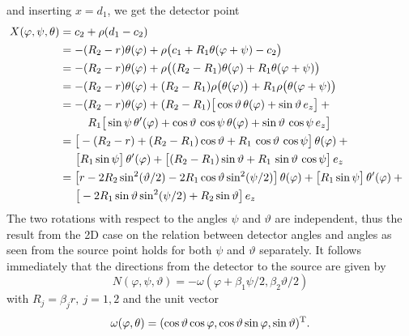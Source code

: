 \documentclass{amsart}
\renewcommand*{\phi}{\varphi}
\begin{document}
%
and inserting $x = d_1$, we get the detector point
%
\begin{align}
 X(\phi, \psi, \theta)
 &= c_2 + \rho(d_1 - c_2) \notag \\
 &= -(R_2 - r) \theta(\phi) + \rho\big(c_1 + R_1 \theta(\phi + \psi) - c_2\big) \notag \\
 &= -(R_2 - r) \theta(\phi) + \rho\big((R_2-R_1) \theta(\phi) + R_1 \theta(\phi + \psi)\big) \notag \\
 &= -(R_2 - r) \theta(\phi) + (R_2-R_1) \rho\big(\theta(\phi)\big) + R_1 \rho\big(\theta(\phi + \psi)\big) \notag \\
 &= -(R_2 - r) \theta(\phi) + (R_2-R_1) \big[ \cos\vartheta\, \theta(\phi) + \sin\vartheta\, e_z \big] + \phantom{x} \notag \\
 &\hspace{25pt} R_1 \big[ \sin\psi\, \theta'(\phi) + \cos\vartheta\, \cos\psi\, \theta(\phi) + \sin\vartheta\, \cos\psi\, e_z \big] \notag 
 \\
 &= \big[ -(R_2 - r) + (R_2 - R_1) \cos\vartheta + R_1 \, \cos\vartheta\, \cos\psi \big]\, \theta(\phi) + \phantom{x} \notag \\
 &\hspace{14pt} \big[R_1 \sin\psi\big]\, \theta'(\phi) + \big[ (R_2 - R_1) \sin\vartheta + R_1\, \sin\vartheta\, \cos\psi \big]\, e_z 
\notag  \\
 \label{eq:conecurved:detector_parametr}
 &= \big[ r - 2R_2 \sin^2(\vartheta/2) - 2R_1 \cos\vartheta \sin^2(\psi/2) \big]\, \theta(\phi) + \big[R_1 \sin\psi\big]\, 
 \theta'(\phi) + \phantom{x} \\
 &\hspace{14pt} \big[ -2R_1 \sin\vartheta\sin^2(\psi/2) + R_2\sin\vartheta \big]\, e_z \notag 
\end{align}
%
%
The two rotations with respect to the angles $\psi$ and $\vartheta$ are independent, thus the result from the 2D case on the relation 
between detector angles and angles as seen from the source point holds for both $\psi$ and $\vartheta$ separately. It follows immediately 
that the directions from the detector to the source are given by
%
\begin{equation}
 \label{eq:conecurved:direction_field}
 N(\phi, \psi, \vartheta) = -\omega(\phi + \beta_1\psi/2, \beta_2\vartheta/2)
\end{equation} 
%
with $R_j = \beta_j r,\ j=1,2$ and the unit vector
%
\begin{equation}
 \label{eq:conecurved:unitvec_omega}
 \omega(\phi, \theta) = \TRANSP{(\cos\vartheta \cos\phi, \cos\vartheta\sin\phi, \sin\vartheta)}.
\end{equation} 
\end{document}
